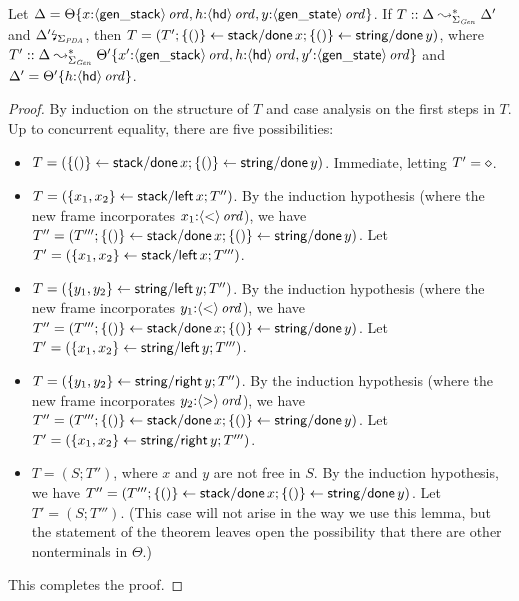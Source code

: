 \bigskip
\begin{lemma}
  Let $\Delta = {\Theta}\{{x{:}{\langle {\sf gen\_stack} \rangle}\,{{\it ord}},
    h{:}{\langle {\sf hd} \rangle}\,{{\it ord}}, y{:}{\langle {\sf gen\_state} \rangle}\,{{\it ord}}}\}$.
  If $T :: \Delta \leadsto^*_{\Sigma_{\it Gen}} \Delta'$ and
  ${\Delta'}{\mbox{\lightning}}_{\Sigma_{\it PDA}}$, then $T = (T';
  \{{()}\} \leftarrow {{\sf stack/done}\,x}; \{{()}\} \leftarrow {{\sf
      string/done}\,y})$, where $T' ::
  \Delta \leadsto^*_{\Sigma_{\it Gen}}
  {\Theta'}\{{x'{:}{\langle {\sf gen\_stack} \rangle}\,{{\it ord}},
    h{:}{\langle {\sf hd} \rangle}\,{{\it ord}}, y'{:}{\langle {\sf gen\_state} \rangle}\,{{\it ord}}}\}$
  and $\Delta' = {\Theta'}\{{h{:}{\langle {\sf hd} \rangle}\,{{\it ord}}}\}$.
\end{lemma}
\begin{proof}
By induction on the structure of $T$ and case analysis on the first
steps in $T$. Up to concurrent equality, there are five possibilities:
\begin{itemize}
\item $T = (\{{()}\} \leftarrow {{\sf stack/done}\,x}; \{{()}\} \leftarrow {{\sf
      string/done}\,y})$. Immediate, letting $T' = \diamond$.
\item $T = (\{{x_1,x_2}\} \leftarrow {{\sf stack/left}\,x}; T'')$. By the
  induction hypothesis (where the new frame incorporates
  $x_1{:}{\langle {\sf <} \rangle}\,{{\it ord}}$), we have $T'' = (T''';
  \{{()}\} \leftarrow {{\sf stack/done}\,x}; \{{()}\} \leftarrow {{\sf
      string/done}\,y})$. Let $T' = (\{{x_1,x_2}\} \leftarrow {{\sf
      stack/left}\,x}; T''')$.
\item $T = (\{{y_1,y_2}\} \leftarrow {{\sf string/left}\,y}; T'')$. By the
  induction hypothesis (where the new frame incorporates
  $y_1{:}{\langle {\sf <} \rangle}\,{{\it ord}}$), we have $T'' = (T''';
  \{{()}\} \leftarrow {{\sf stack/done}\,x}; \{{()}\} \leftarrow {{\sf
      string/done}\,y})$. Let $T' = (\{{x_1,x_2}\} \leftarrow {{\sf
      string/left}\,y}; T''')$.
\item $T = (\{{y_1,y_2}\} \leftarrow {{\sf string/right}\,y}; T'')$. By the
  induction hypothesis (where the new frame incorporates
  $y_2{:}{\langle {\sf >} \rangle}\,{{\it ord}}$), we have $T'' = (T''';
  \{{()}\} \leftarrow {{\sf stack/done}\,x}; \{{()}\} \leftarrow {{\sf
      string/done}\,y})$. Let $T' = (\{{x_1,x_2}\} \leftarrow {{\sf
      string/right}\,y}; T''')$.
\item $T = (S; T'')$, where $x$ and $y$ are not free in $S$. 
      By the induction hypothesis, we have
      $T'' = (T''';
       \{{()}\} \leftarrow {{\sf stack/done}\,x}; \{{()}\} \leftarrow {{\sf
       string/done}\,y})$. Let $T' = (S; T''')$. (This case will not arise
      in the way we use this lemma, but the statement of the theorem 
      leaves open the possibility that there are other nonterminals
      in $\Theta$.)
\end{itemize}
This completes the proof. 
\end{proof}

